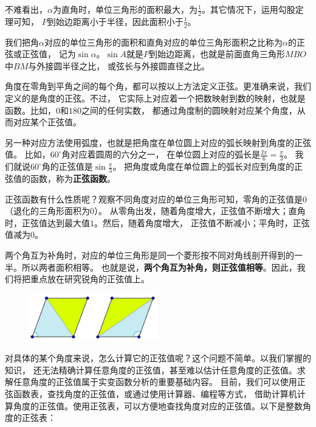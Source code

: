 \documentclass[12pt,UTF8]{ctexbook}
\begin{document}
不难看出，$\alpha$为直角时，单位三角形的面积最大，为$\frac{1}{2}$。其它情况下，运用勾股定理可知，
$P$到始边距离小于半径，因此面积小于$\frac{1}{2}$。

我们把角$\alpha$对应的单位三角形的面积和直角对应的单位三角形面积之比称为$\alpha$的正弦或正弦值，
记为$\sin \alpha$。$\sin A$就是$P$到始边距离，也就是前面直角三角形$MBO$中$BM$与外接圆半径之比，
或弦长与外接圆直径之比。

角度在零角到平角之间的每个角，都可以按以上方法定义正弦。更准确来说，我们定义的是角度的正弦。不过，
它实际上对应着一个把数映射到数的映射，也就是函数。比如，$0$和$180$之间的任何实数，
都通过角度制的圆映射对应某个角度，从而对应某个正弦值。

另一种对应方法使用弧度，也就是把角度在单位圆上对应的弧长映射到角度的正弦值。
比如，$60^\circ$角对应着圆周的六分之一，
在单位圆上对应的弧长是$\frac{2\pi}{6} = \frac{\pi}{3}$。
我们就说$60^\circ$角的正弦值是$\sin \frac{\pi}{3}$。
把角度或角度在单位圆上的弧长对应到角度的正弦值的函数，称为\textbf{正弦函数}。

正弦函数有什么性质呢？观察不同角度对应的单位三角形可知，零角的正弦值是$0$（退化的三角形面积为$0$）。
从零角出发，随着角度增大，正弦值不断增大；直角时，正弦值达到最大值$1$。然后，随着角度增大，
正弦值不断减小；平角时，正弦值减为$0$。

两个角互为补角时，对应的单位三角形是同一个菱形按不同对角线剖开得到的一半。所以两者面积相等。
也就是说，\textbf{两个角互为补角，则正弦值相等}。因此，我们将把重点放在研究锐角的正弦值上。

\begin{figure}[H] %
    \vspace{4pt}
    \centering
    \includegraphics[width=0.5\textwidth]{tu/正弦菱形1.png}
\end{figure}

对具体的某个角度来说，怎么计算它的正弦值呢？这个问题不简单。以我们掌握的知识，
还无法精确计算任意角度的正弦值，甚至难以估计任意角度的正弦值。求解任意角度的正弦值属于实变函数分析的重要基础内容。
目前，我们可以使用正弦函数表，查找角度的正弦值，或通过使用计算器、编程等方式，
借助计算机计算角度的正弦值。使用正弦表，可以方便地查找角度对应的正弦值。以下是整数角度的正弦表：
\end{document}
